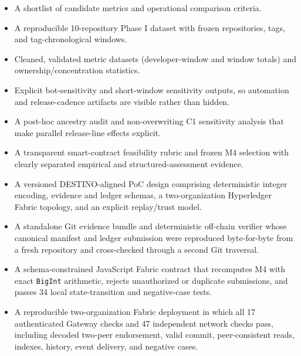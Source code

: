 \begin{itemize}[leftmargin=*]
  \item A shortlist of candidate metrics and operational comparison criteria.
  \item A reproducible 10-repository Phase I dataset with frozen repositories, tags, and tag-chronological windows.
  \item Cleaned, validated metric datasets (developer-window and window totals) and ownership/concentration statistics.
  \item Explicit bot-sensitivity and short-window sensitivity outputs, so automation and release-cadence artifacts are visible rather than hidden.
  \item A post-hoc ancestry audit and non-overwriting C1 sensitivity analysis that make parallel release-line effects explicit.
  \item A transparent smart-contract feasibility rubric and frozen M4 selection with clearly separated empirical and structured-assessment evidence.
  \item A versioned DESTINO-aligned PoC design comprising deterministic integer encoding, evidence and ledger schemas,
  a two-organization Hyperledger Fabric topology, and an explicit replay/trust model.
  \item A standalone Git evidence bundle and deterministic off-chain verifier whose canonical manifest and ledger submission
  were reproduced byte-for-byte from a fresh repository and cross-checked through a second Git traversal.
  \item A schema-constrained JavaScript Fabric contract that recomputes M4 with exact \texttt{BigInt} arithmetic, rejects
  unauthorized or duplicate submissions, and passes 34 local state-transition and negative-case tests.
  \item A reproducible two-organization Fabric deployment in which all 17 authenticated Gateway checks and 47 independent
  network checks pass, including decoded two-peer endorsement, valid commit, peer-consistent reads, indexes, history, event
  delivery, and negative cases.
\end{itemize}
